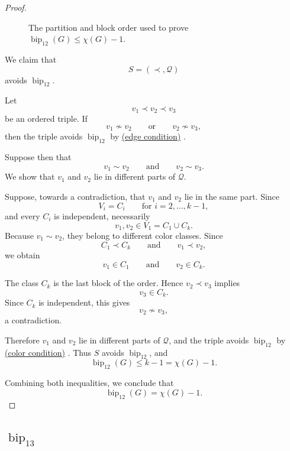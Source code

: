 \documentclass[12pt]{article}
\theoremstyle{plain}
\theoremstyle{definition}
\theoremstyle{remark}
\theoremstyle{definition}
\newcommand{\edgecondition}{%
  \hyperref[def:avoid:cond:edge]{(edge condition)}\xspace
}
\newcommand{\colorcondition}{%
  \hyperref[def:avoid:cond:color]{(color condition)}\xspace
}
\newcommand{\biplabel}{\mathrm{bip}}
\DeclareRobustCommand{\bipparam}[1]{%
  \ensuremath{\mathop{\biplabel}\nolimits_{#1}}%
}
\begin{document}
\begin{proof}
\begin{figure}[t]
\caption{The partition and block order used to prove
\(\bipparam{12}(G)\le\chi(G)-1\).}
\label{fig:bip12-upper-bound}
\end{figure}

We claim that
\[
S=(\prec,\mathcal Q)
\]
avoids \(\operatorname{bip}_{12}\).

Let
\[
v_1\prec v_2\prec v_3
\]
be an ordered triple. If
\[
v_1\not\sim v_2
\qquad\text{or}\qquad
v_2\not\sim v_3,
\]
then the triple avoids \(\operatorname{bip}_{12}\) by \edgecondition.

Suppose then that
\[
v_1\sim v_2
\qquad\text{and}\qquad
v_2\sim v_3.
\]
We show that \(v_1\) and \(v_2\) lie in different parts of \(\mathcal Q\).

Suppose, towards a contradiction, that \(v_1\) and \(v_2\) lie in the same part. Since
\[
V_i=C_i
\qquad\text{for }i=2,\dots,k-1,
\]
and every \(C_i\) is independent, necessarily
\[
v_1,v_2\in V_1=C_1\cup C_k.
\]
Because \(v_1\sim v_2\), they belong to different color classes. Since
\[
C_1\prec C_k
\qquad\text{and}\qquad
v_1\prec v_2,
\]
we obtain
\[
v_1\in C_1
\qquad\text{and}\qquad
v_2\in C_k.
\]

The class \(C_k\) is the last block of the order. Hence \(v_2\prec v_3\) implies
\[
v_3\in C_k.
\]
Since \(C_k\) is independent, this gives
\[
v_2\not\sim v_3,
\]
a contradiction.

Therefore \(v_1\) and \(v_2\) lie in different parts of \(\mathcal Q\), and the triple avoids
\(\operatorname{bip}_{12}\) by \colorcondition. Thus \(S\) avoids \(\operatorname{bip}_{12}\), and
\[
\bipparam{12}(G)\le k-1=\chi(G)-1.
\]

Combining both inequalities, we conclude that
\[
\bipparam{12}(G)=\chi(G)-1.
\]
\end{proof}




\subsection{\texorpdfstring{\(\bipparam{13}\)}{bip13}}
\label{subsec:bip13}
\end{document}
